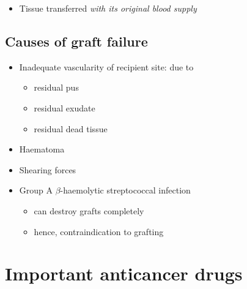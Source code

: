 \documentclass[
  14pt,
]{memoir}
\providecommand{\tightlist}{%
  \setlength{\itemsep}{0pt}\setlength{\parskip}{0pt}}
\begin{document}
\begin{itemize}
\tightlist
\item
  Tissue transferred \emph{with its original blood supply}
\end{itemize}

\hypertarget{causes-of-graft-failure}{%
\section{Causes of graft failure}\label{causes-of-graft-failure}}

\begin{itemize}
\tightlist
\item
  Inadequate vascularity of recipient site: due to

  \begin{itemize}
  \tightlist
  \item
    residual pus
  \item
    residual exudate
  \item
    residual dead tissue
  \end{itemize}
\item
  Haematoma
\item
  Shearing forces
\item
  Group A \(\beta\)-haemolytic streptococcal infection

  \begin{itemize}
  \tightlist
  \item
    can destroy grafts completely
  \item
    hence, contraindication to grafting
  \end{itemize}
\end{itemize}

\pagebreak

\hypertarget{important-anticancer-drugs}{%
\chapter{Important anticancer drugs}\label{important-anticancer-drugs}}
\end{document}
